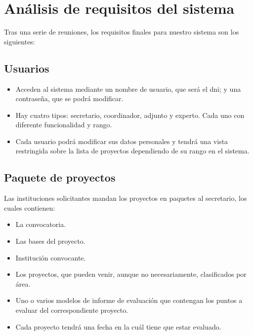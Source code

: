 \documentclass[12pt,a4paper,spanish,twoside]{book}
\begin{document}
\section{Análisis de requisitos del sistema}
Tras una serie de reuniones, los requisitos finales para nuestro sistema son
los siguientes: 

\subsection{Usuarios}
\begin{itemize}
\item Acceden al sistema mediante un nombre de usuario, que será el dni; y una 
contraseña, que se podrá modificar.
\item Hay cuatro tipos: secretario, coordinador, adjunto y experto. Cada uno
  con diferente funcionalidad y rango. 
\item Cada usuario podrá modificar sus datos personales y tendrá una vista
  restringida sobre la lista de proyectos dependiendo de su rango en el 
  sistema.
\end{itemize}

\subsection{Paquete de proyectos}
Las instituciones solicitantes mandan los proyectos en paquetes al
secretario, los cuales contienen: 
\begin{itemize}
\item La convocatoria.
\item Las bases del proyecto.
\item Institución convocante.
\item Los proyectos, que pueden venir, aunque no necesariamente, clasificados
  por área. 
\item Uno o varios modelos de informe de evaluación que contengan los puntos
  a evaluar del correspondiente proyecto. 
\item Cada proyecto tendrá una fecha en la cuál tiene que estar evaluado.
\end{itemize}
\end{document}
